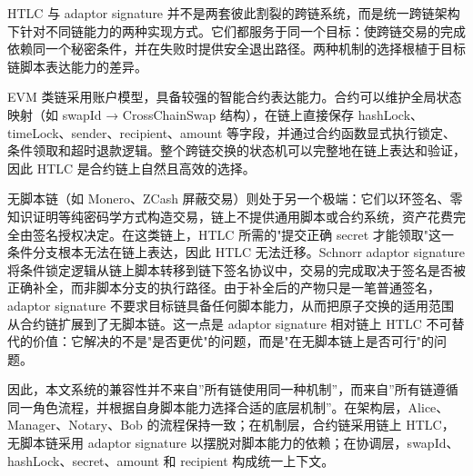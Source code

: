 HTLC 与 adaptor signature 并不是两套彼此割裂的跨链系统，而是统一跨链架构下针对不同链能力的两种实现方式。它们都服务于同一个目标：使跨链交易的完成依赖同一个秘密条件，并在失败时提供安全退出路径。两种机制的选择根植于目标链脚本表达能力的差异。


EVM 类链采用账户模型，具备较强的智能合约表达能力。合约可以维护全局状态映射（如 swapId → CrossChainSwap 结构），在链上直接保存 hashLock、timeLock、sender、recipient、amount 等字段，并通过合约函数显式执行锁定、条件领取和超时退款逻辑。整个跨链交换的状态机可以完整地在链上表达和验证，因此 HTLC 是合约链上自然且高效的选择。


无脚本链（如 Monero、ZCash 屏蔽交易）则处于另一个极端：它们以环签名、零知识证明等纯密码学方式构造交易，链上不提供通用脚本或合约系统，资产花费完全由签名授权决定。在这类链上，HTLC 所需的"提交正确 secret 才能领取"这一条件分支根本无法在链上表达，因此 HTLC 无法迁移。Schnorr adaptor signature 将条件锁定逻辑从链上脚本转移到链下签名协议中，交易的完成取决于签名是否被正确补全，而非脚本分支的执行路径。由于补全后的产物只是一笔普通签名，adaptor signature 不要求目标链具备任何脚本能力，从而把原子交换的适用范围从合约链扩展到了无脚本链。这一点是 adaptor signature 相对链上 HTLC 不可替代的价值：它解决的不是"是否更优"的问题，而是"在无脚本链上是否可行"的问题。


因此，本文系统的兼容性并不来自”所有链使用同一种机制”，而来自”所有链遵循同一角色流程，并根据自身脚本能力选择合适的底层机制”。在架构层，Alice、Manager、Notary、Bob 的流程保持一致；在机制层，合约链采用链上 HTLC，无脚本链采用 adaptor signature 以摆脱对脚本能力的依赖；在协调层，swapId、hashLock、secret、amount 和 recipient 构成统一上下文。
